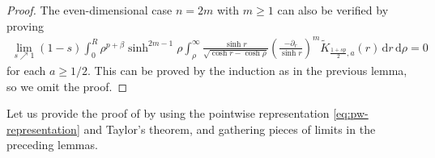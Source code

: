 \documentclass[11pt]{amsart}
\theoremstyle{plain}
\theoremstyle{definition}
\numberwithin{equation}{section}
\begin{document}
\begin{proof}
The even-dimensional case $n=2m$ with $m \geq 1$ can also be verified by proving
\begin{equation*}
\begin{split}
\lim_{s \nearrow 1} (1-s) \int_{0}^{R} \rho^{p+\beta} \sinh^{2m-1}\rho \int_{\rho}^{\infty} \frac{\sinh r}{\sqrt{\cosh r - \cosh \rho}} \left( \frac{-\partial_{r}}{\sinh r} \right)^{m} \widetilde{K}_{\frac{1+sp}{2},a}(r) \, \mathrm{d}r \,\mathrm{d}\rho = 0
\end{split}
\end{equation*}
for each $a \geq 1/2$. This can be proved by the induction as in the previous lemma, so we omit the proof.
\end{proof}

Let us provide the proof of  by using the pointwise representation \eqref{eq:pw-representation} and Taylor's theorem, and gathering pieces of limits in the preceding lemmas.
\end{document}
